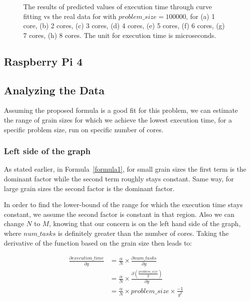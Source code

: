 \begin{figure}[H]
{		\label{fig50:h}}\hfill
	\caption{The results of predicted values of execution time through curve fitting vs the real data for with $problem\_size=100000$, for (a) 1 core, (b) 2 cores, (c) 3 cores, (d) 4 cores, (e) 5 cores, (f) 6 cores, (g) 7 cores, (h) 8 cores. The unit for execution time is microseconds.}
	\label{fig50}	
\end{figure}

\subsection{Raspberry Pi 4}


\vspace{\baselineskip}
\subsection{Analyzing the Data}
Assuming the proposed formula is a good fit for this problem, we can estimate the range of grain sizes for which we achieve the lowest execution time, for a specific problem size, run on specific number of cores.

\vspace{\baselineskip}
\subsubsection{Left side of the graph}
As stated earlier, in Formula~\ref{formula1}, for small grain sizes the first term is the dominant factor while the second term roughly stays constant. Same way, for large grain sizes the second factor is the dominant factor. 

In order to find the lower-bound of the range for which the execution time stays constant, we assume the second factor is constant in that region. Also we can change $N$ to $M$, knowing that our concern is on the left hand side of the graph, where $num\_{tasks}$ is definitely greater than the number of cores. 
Taking the derivative of the function based on the grain size then leads to:

 
\begin{equation}\label{formula3}
\begin{aligned}
\frac{\partial execution\_{time}}{\partial g} &= \frac{\alpha}{N}\times{\frac{\partial num\_{tasks}}{\partial g}}\\
&=\frac{\alpha}{N}\times\frac{\partial(\frac{problem\_{size}}{g})}{\partial g} \\
&=\frac{\alpha}{N}\times{problem\_{size}}\times{\frac{-1}{g^2}}
\end{aligned}
\end{equation}

